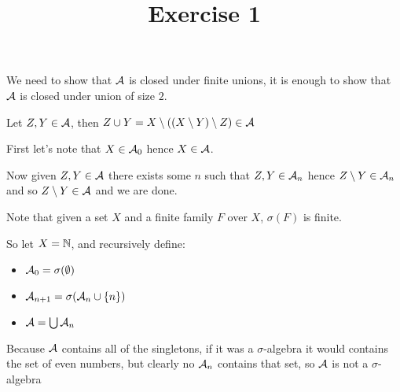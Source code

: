 

\usepackage{skak}
\usepackage{relsize}
\usepackage{graphicx}
\usepackage{mathtools}

\usepackage{textcomp}
\usepackage{bbding}

\usepackage{soul}

\newcommand{\flower}{\text{\scalebox{0.75}{\raisebox{-0.7ex}{
				\rotatebox{90}{\textleaf}\hspace{-0.3em}
				\scalebox{0.7}{\textleaf}\hspace{-1.35em}
				\raisebox{1ex}{\scalebox{0.8}{\FiveFlowerOpen}}
}}}}
\title{Exercise 1}

\maketitle
\begin{cExercise}
	\begin{cPart}
		We need to show that $\cal A$ is closed under finite unions, it is enough to show that $\cal A$ is closed under union of size $2$.
		
		Let $Z,Y\in\cal A$, then $Z\cup Y=X\setminus((X\setminus Y)\setminus Z)\in\cal A$
	\end{cPart}
	\begin{cPart}
		First let's note that $X\in \cal A_0$ hence $X\in \cal A$.
		
		Now given $Z,Y\in\cal A$ there exists some $n$ such that $Z,Y\in \cal A_n$ hence $Z\setminus Y\in\cal A_n$ and so $Z\setminus Y\in \cal A$ and we are done.
	\end{cPart}
	\begin{cPart}
		Note that given a set $X$ and a finite family $F$ over $X$, $\sigma(F)$ is finite.
		
		So let $X=\N$, and recursively define:
		
		\begin{itemize}
			\item $\cal A_0=\sigma(\emptyset)$
			\item $\cal A_{n+1}=\sigma(\cal A_n\cup\{n\})$
			\item $\cal A=\bigcup \cal A_n$
		\end{itemize}
		Because $\cal A$ contains all of the singletons, if it was a $\sigma$-algebra it would contains the set of even numbers, but clearly no $\cal A_n$ contains that set, so $\cal A$ is not a $\sigma$-algebra
	\end{cPart}
\end{cExercise}
